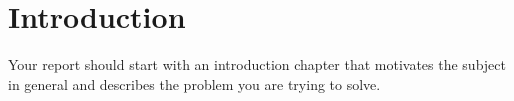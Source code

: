 \chapter{Introduction}
Your report should start with an introduction chapter that motivates the subject in general and describes the problem you are trying to solve.